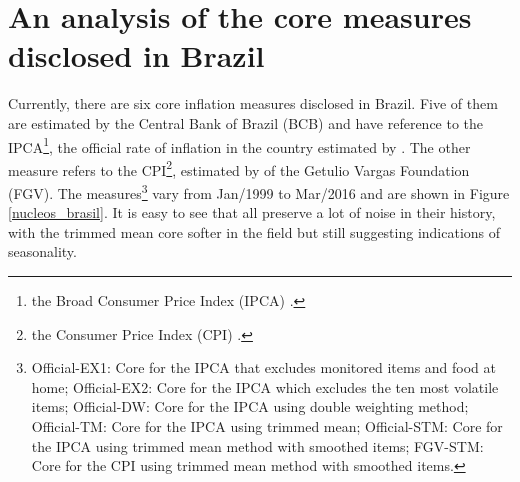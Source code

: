 \documentclass[10pt]{article}
\begin{document}
\section{An analysis of the core measures disclosed in Brazil}\label{critica}

Currently, there are six core inflation measures disclosed in Brazil. Five of them are estimated by the Central Bank of Brazil (BCB) and have reference to the IPCA\footnote{the Broad Consumer Price Index (IPCA) \citep{ipca}.}, the official rate of inflation in the country estimated by \cite{ibge1}. The other measure refers to the CPI\footnote{the Consumer Price Index (CPI) \citep{ipcibre}.}, estimated by \cite{ibre} of the Getulio Vargas Foundation (FGV). The measures\footnote{Official-EX1: Core for the IPCA that excludes monitored items and food at home; Official-EX2: Core for the IPCA which excludes the ten most volatile items; Official-DW: Core for the IPCA using double weighting method; Official-TM: Core for the IPCA using trimmed mean; Official-STM: Core for the IPCA using trimmed mean method with smoothed items; FGV-STM: Core for the CPI using trimmed mean method with smoothed items.} vary from Jan/1999 to Mar/2016 and are shown in Figure \ref{nucleos_brasil}. It is easy to see that all preserve a lot of noise in their history, with the trimmed mean core softer in the field but still suggesting indications of seasonality.


\end{document}

